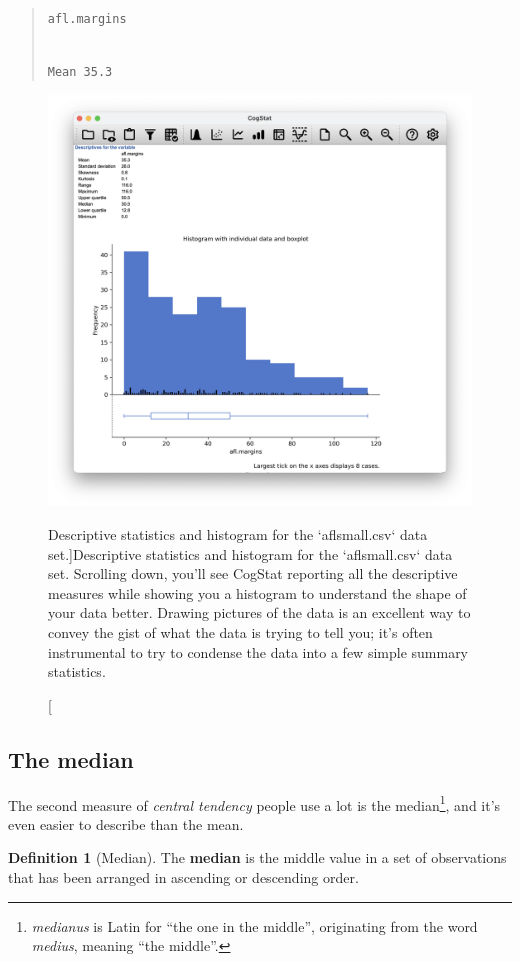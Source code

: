 \documentclass[
  11pt,
]{book}
\theoremstyle{definition}
\newtheorem{definition}{Definition}[chapter]
\theoremstyle{definition}
\theoremstyle{definition}
\theoremstyle{definition}
\theoremstyle{remark}
\begin{document}
\begin{quote}
\texttt{afl.margins}\strut \\
\texttt{Mean\ 35.3}
\end{quote}

\begin{figure}

{\centering \includegraphics[width=0.66\linewidth]{resources/image/cogstathistogramaflsmall} 

}

\caption[Descriptive statistics and histogram for the `aflsmall.csv` data set.]{Descriptive statistics and histogram for the `aflsmall.csv` data set. Scrolling down, you'll see CogStat reporting all the descriptive measures while showing you a histogram to understand the shape of your data better. Drawing pictures of the data is an excellent way to convey the gist of what the data is trying to tell you; it's often instrumental to try to condense the data into a few simple summary statistics.}\label{fig:histogramaflsmall}
\end{figure}

\hypertarget{median}{%
\subsection{The median}\label{median}}

The second measure of \emph{central tendency} people use a lot is the median\footnote{\emph{medianus} is Latin for ``the one in the middle'', originating from the word \emph{medius}, meaning ``the middle''.}, and it's even easier to describe than the mean.

\begin{definition}[Median]
\protect\hypertarget{def:defmedian}{}\label{def:defmedian}The \textbf{median} is the middle value in a set of observations that has been arranged in ascending or descending order.
\end{definition}
\end{document}
